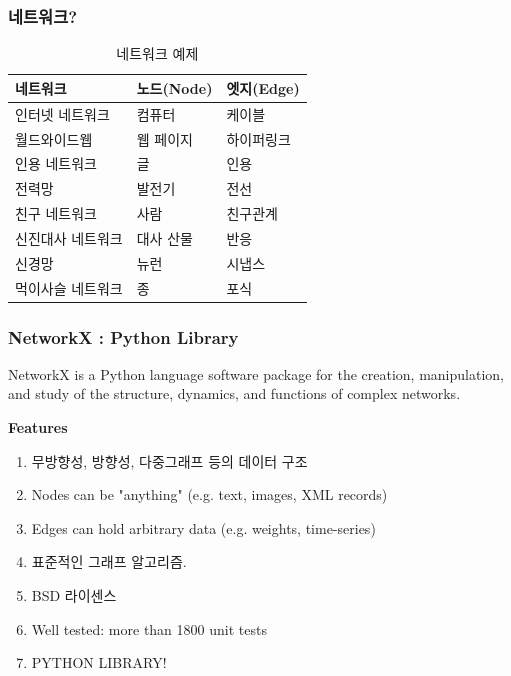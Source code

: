 \documentclass{beamer}
\newcommand{\fbckg}[1]{\usebackgroundtemplate{\texttt{[image: \#1]}}}%
\begin{document}
\begin{frame}
\frametitle{네트워크?}
\begin{table}
\begin{tabular}{l | l l}
\toprule
\textbf{네트워크} & \textbf{노드}(Node) & \textbf{엣지}(Edge)\\
\midrule
인터넷 네트워크 & 컴퓨터 & 케이블 \\
월드와이드웹 & 웹 페이지 & 하이퍼링크 \\
인용 네트워크 & 글 & 인용 \\
전력망 & 발전기 & 전선 \\
친구 네트워크 & 사람 & 친구관계 \\
신진대사 네트워크 & 대사 산물 & 반응 \\
신경망 & 뉴런 & 시냅스 \\
먹이사슬 네트워크 & 종 & 포식 \\
\bottomrule
\end{tabular}
\caption{네트워크 예제}
\end{table}
\end{frame}

{
\fbckg{networkx.png}
\begin{frame}
\frametitle{NetworkX : Python Library}
NetworkX is a Python language software package for the creation, manipulation, and study of the structure, dynamics, and functions of complex networks.

\textbf{Features}
\begin{enumerate}
\item 무방향성, 방향성, 다중그래프 등의 데이터 구조
\item Nodes can be "anything" (e.g. text, images, XML records)
\item Edges can hold arbitrary data (e.g. weights, time-series)
\item 표준적인 그래프 알고리즘.
\item BSD 라이센스
\item Well tested: more than 1800 unit tests
\item PYTHON LIBRARY!
\end{enumerate}
\end{frame}
}
\end{document}
